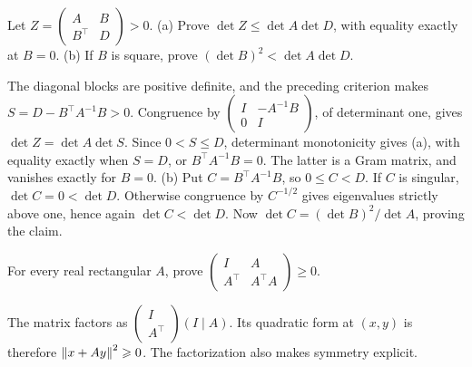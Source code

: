 \begin{problem}\label{ex:12:ineq-ma-34}
Let \(Z=\begin{pmatrix}A&B\\B^\top&D\end{pmatrix}>0\).
(a) Prove \(\det Z\leqslant\det A\det D\), with equality exactly at \(B=0\).
(b) If \(B\) is square, prove \((\det B)^2<\det A\det D\).
\end{problem}
\begin{solution}
The diagonal blocks are positive definite, and the preceding criterion
makes \(S=D-B^\top A^{-1}B>0\).
Congruence by \(\begin{pmatrix}I&-A^{-1}B\\0&I\end{pmatrix}\), of
determinant one, gives \(\det Z=\det A\det S\).
Since \(0<S\leqslant D\), determinant monotonicity gives (a), with
equality exactly when \(S=D\), or \(B^\top A^{-1}B=0\).
The latter is a Gram matrix, and vanishes exactly for \(B=0\).
(b) Put \(C=B^\top A^{-1}B\), so \(0\leqslant C<D\).
If \(C\) is singular, \(\det C=0<\det D\). Otherwise congruence by
\(C^{-1/2}\) gives eigenvalues strictly above one, hence again
\(\det C<\det D\). Now \(\det C=(\det B)^2/\det A\), proving the claim.
\end{solution}

\begin{problem}\label{ex:12:ineq-ma-35}
For every real rectangular \(A\), prove
\(\begin{pmatrix}I&A\\A^\top&A^\top A\end{pmatrix}\geqslant0\).
\end{problem}
\begin{solution}
The matrix factors as
\(\begin{pmatrix}I\\A^\top\end{pmatrix}(I\mid A)\).
Its quadratic form at \((x,y)\) is therefore \(\left\lVert x+Ay\right\rVert^2\geqslant0\).
The factorization also makes symmetry explicit.
\end{solution}

